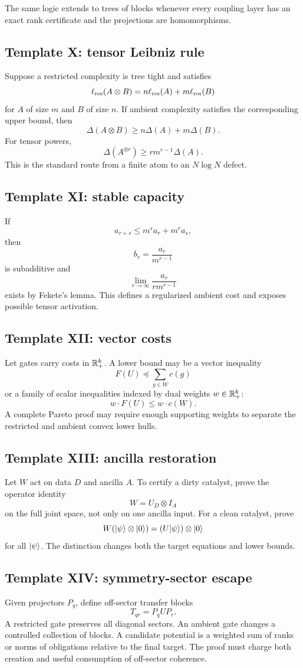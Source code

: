 The same logic extends to trees of blocks whenever every coupling layer has an exact rank certificate and the projections are homomorphisms.

\subsection{Template X: tensor Leibniz rule}
Suppose a restricted complexity is tree tight and satisfies
\[
\ell_{\mathrm{res}}(A\otimes B)
=n\ell_{\mathrm{res}}(A)+m\ell_{\mathrm{res}}(B)
\]
for $A$ of size $m$ and $B$ of size $n$.  If ambient complexity satisfies the corresponding upper bound, then
\[
\Delta(A\otimes B)
\ge
n\Delta(A)+m\Delta(B).
\]
For tensor powers,
\[
\Delta(A^{\otimes r})
\ge
r m^{r-1}\Delta(A).
\]
This is the standard route from a finite atom to an $N\log N$ defect.

\subsection{Template XI: stable capacity}
If
\[
a_{r+s}\le m^s a_r+m^r a_s,
\]
then
\[
b_r=\frac{a_r}{m^{r-1}}
\]
is subadditive and
\[
\lim_{r\to\infty}\frac{a_r}{r m^{r-1}}
\]
exists by Fekete's lemma.  This defines a regularized ambient cost and exposes possible tensor activation.

\subsection{Template XII: vector costs}
Let gates carry costs in $\mathbb R_+^k$.  A lower bound may be a vector inequality
\[
F(U)\preceq\sum_{g\in W}c(g)
\]
or a family of scalar inequalities indexed by dual weights $w\in\mathbb R_+^k$:
\[
w\cdot F(U)\le w\cdot c(W).
\]
A complete Pareto proof may require enough supporting weights to separate the restricted and ambient convex lower hulls.

\subsection{Template XIII: ancilla restoration}
Let $W$ act on data $D$ and ancilla $A$.  To certify a dirty catalyst, prove the operator identity
\[
W=U_D\otimes I_A
\]
on the full joint space, not only on one ancilla input.  For a clean catalyst, prove
\[
W(\lvert \psi\rangle\otimes\lvert 0\rangle)
=(U\lvert \psi\rangle)\otimes\lvert 0\rangle
\]
for all $\lvert \psi\rangle$.  The distinction changes both the target equations and lower bounds.

\subsection{Template XIV: symmetry-sector escape}
Given projectors $P_q$, define off-sector transfer blocks
\[
T_{qr}=P_qUP_r.
\]
A restricted gate preserves all diagonal sectors.  An ambient gate changes a controlled collection of blocks.  A candidate potential is a weighted sum of ranks or norms of obligations relative to the final target.  The proof must charge both creation and useful consumption of off-sector coherence.

